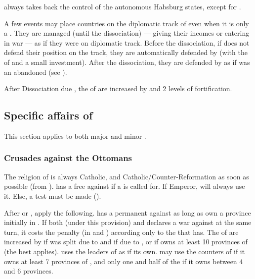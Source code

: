 \aparag {} always takes back the control of the autonomous
Habsburg states, except for .

\aparag A few events may place countries on the diplomatic track of \HAB
even when it is only a \MIN. They are managed (until the dissociation)
--- giving their incomes or entering in war --- as if they were on \SPA
diplomatic track.
\bparag Before the dissociation, if \SPA does not defend their position
on the track, they are automatically defended by  (with
the \DIP of \SPA and a small investment).
\bparag After the dissociation, they are defended by \HAB as if \HAB was
an abandoned \MAJ (see ).

\aparag After Dissociation due , the  of  are increased by \ARMY\faceplus and 2
levels of fortification.

\subsection{Specific affairs of \HAB}

This section applies to both major and minor \HAB.

\subsubsection{Crusades against the Ottomans}

The religion of  is always Catholic, and
Catholic/Counter-Reformation as soon as possible (from
).
\bparag \HAB has a free \CB against \TUR if a  is called
for. If Emperor,  will always use it. Else, a test must be made
().

After  or , 
apply the following.
\bparag \HAB has a permanent \CB against \TUR as long as \TUR own a
province initially in .
\bparag If both  (under this provision) and \SPA declares a war 
against \TUR at the same turn, it costs the penalty (in \STAB and \PV) 
according only to the \CB that \SPA has.
\bparag The  of \HAB are increased by
\ARMY\facemoins if  was split due to   and \ARMY\faceplus if due to ,
 or \ARMY\faceplus if \HAB owns at least 10 provinces of 
 (the best applies).
\bparag \HAB uses the leaders of  as if its own.
\HAB may use the counters of  if it owns at least
7 provinces of , and only one \ARMY and half of the \LD if
it owns between 4 and 6 provinces.

